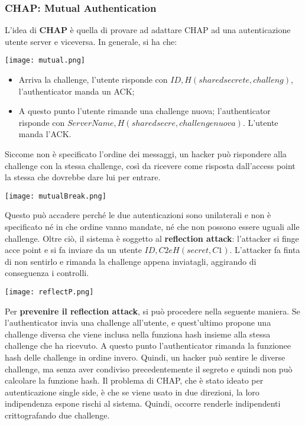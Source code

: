 \documentclass{article}
\theoremstyle{remark}
\begin{document}
\subsubsection{CHAP: Mutual Authentication}
L'idea di \textbf{CHAP} è quella di provare ad adattare CHAP ad una autenticazione utente server e viceversa. In generale, si ha che:
\begin{center}
	\texttt{[image: mutual.png]}
\end{center}
\begin{itemize}
	\item Arriva la challenge, l'utente risponde con $ID,H(sharedsecrete, challeng)$, l'authenticator manda un ACK;
	\item A questo punto l'utente rimande una challenge nuova; l'authenticator risponde con $ServerName,H(sharedsecre,challenge nuova)$. L'utente manda l'ACK.
\end{itemize}
Siccome non è specificato l'ordine dei messaggi, un hacker può rispondere alla challenge con la stessa challenge, così da ricevere come risposta dall'access point la stessa che dovrebbe dare lui per entrare.\newline
\begin{center}
	\texttt{[image: mutualBreak.png]}
\end{center}
Questo può accadere perché le due autenticazioni sono unilaterali e non è specificato né in che ordine vanno mandate, né che non possono essere uguali alle challenge. Oltre ciò, il sistema è soggetto al \textbf{reflection attack}: l'attacker si finge acce point e si fa inviare da un utente $ID,C2 e H(secret,C1)$. L'attacker fa finta di non sentirlo e rimanda la challenge appena inviatagli, aggirando di conseguenza i controlli.
\begin{center}
	\texttt{[image: reflectP.png]}
\end{center}
Per \textbf{prevenire il reflection attack}, si può procedere nella seguente maniera. Se l'authenticator invia una challenge all'utente, e quest'ultimo propone una challenge diversa che viene inclusa nella funziona hash insieme alla stessa challenge che ha ricevuto. A questo punto l'authenticator rimanda la funzionee hash delle challenge in ordine invero. Quindi, un hacker può sentire le diverse challenge, ma senza aver condiviso precedentemente il segreto e quindi non può calcolare la funzione hash.
Il problema di CHAP, che è stato ideato per autenticazione single side, è che se viene usato in due direzioni, la loro indipendenza espone rischi al sistema. Quindi, occorre renderle indipendenti crittografando due challenge.
\end{document}
